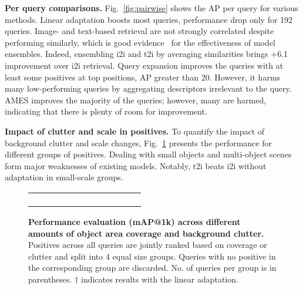 \noindent\textbf{Per query comparisons.} Fig.~\ref{fig:pairwise} shows the AP per query for various methods. Linear adaptation boosts most queries, \ie performance drop only for 192 queries. Image- and text-based retrieval are not strongly correlated despite performing similarly, which is good evidence~\cite{tky+24} for the effectiveness of model ensembles. Indeed, ensembling i2i and t2i by averaging similarities brings +6.1 improvement over i2i retrieval. Query expansion improves the queries with at least some positives at top positions, \ie AP greater than 20. However, it harms many low-performing queries by aggregating descriptors irrelevant to the query. AMES improves the majority of the queries; however, many are harmed, indicating that there is plenty of room for improvement.

\noindent\textbf{Impact of clutter and scale in positives.}
To quantify the impact of background clutter and scale changes, Fig.~\ref{fig:scale_clutter_groups} presents the performance for different groups of positives. Dealing with small objects and multi-object scenes form major weaknesses of existing models. Notably, t2i beats i2i without adaptation in small-scale groups.

\begin{figure}[t]
    \vfill
    \centering
    \begin{tabular}{cc}
        \hspace{-10pt}
        \begin{subfigure}{0.48\textwidth}
            
        \end{subfigure}
        &
        \hspace{-130pt}
        \begin{subfigure}{0.48\textwidth}
            
            \vspace{-0.3pt}
        \end{subfigure}
    \end{tabular}
    \vspace{-10pt}
    \caption{\textbf{Performance evaluation (mAP@1k) across different amounts of object area coverage and background clutter.} Positives across all queries are jointly ranked based on coverage or clutter and split into 4 equal size groups. 
    Queries with no positive in the corresponding group are discarded. No. of queries per group is in parentheses.
    $\dagger$ indicates results with the linear adaptation.
    \vspace{-8pt}
    \label{fig:scale_clutter_groups}}
\end{figure}
